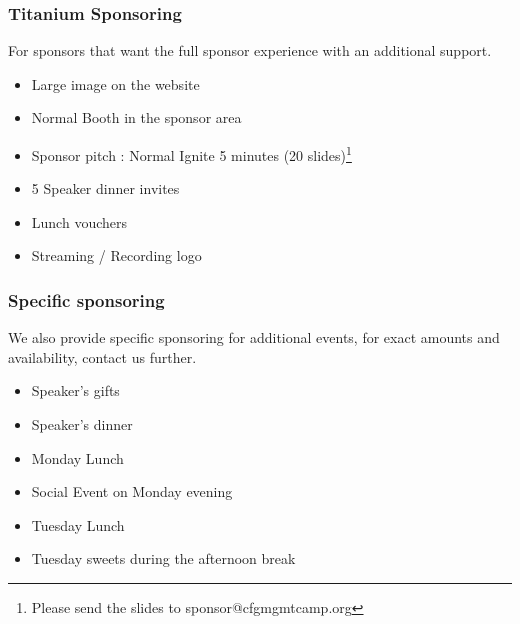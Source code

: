 \begin{frame}
\frametitle{Titanium Sponsoring}
For sponsors that want the full sponsor experience with an additional support.
\begin{itemize}
	\item<+->
	Large image on the website
	\item<+->
	Normal Booth in the sponsor area
	\item<+->
	Sponsor pitch : Normal Ignite 5 minutes (20 slides)\footnote{Please send the slides to sponsor@cfgmgmtcamp.org}
	\item<+->
	5 Speaker dinner invites
	\item<+->
	Lunch vouchers
	\item<+->
	Streaming / Recording logo
\end{itemize}
\end{frame}


\begin{frame}
\frametitle{Specific sponsoring}
We also provide specific sponsoring for additional events, for exact amounts and availability, contact us further.
\begin{itemize}
	\item<+->
	Speaker's gifts
	\item<+->
	Speaker's dinner
	\item<+->
	Monday Lunch
	\item<+->
	Social Event on Monday evening
	\item<+->
	Tuesday Lunch
	\item<+->
	Tuesday sweets during the afternoon break
\end{itemize}
\end{frame}

